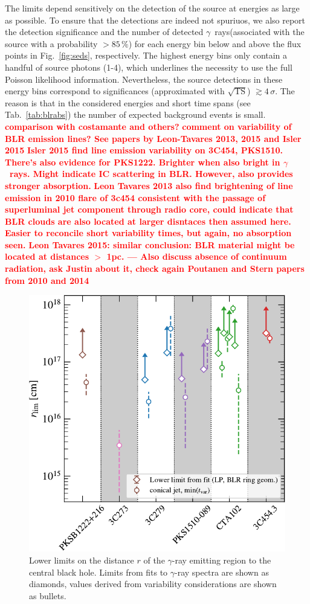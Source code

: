 \documentclass[twocolumn,linenumbers]{aastex62}
\newcommand{\Grays}{$\gamma$~rays\xspace}
\newcommand{\gray}{$\gamma$-ray\xspace}
\newcommand{\todo}[1]{\textbf{\textcolor{red}{#1}}}
\begin{document}
The limits depend sensitively on the detection of the source at energies as large as possible. To ensure that the detections are indeed not spuriuos, we also report the detection significance and the number of detected \Grays (associated with the source with a probability $>85\,\%$) for each energy bin below and above the flux points in Fig.~\ref{fig:seds}, respectively. The highest energy bins only contain a handful of source photons (1-4), which underlines the necessity to use the full Poisson likelihood information. 
Nevertheless, the source detections in these energy bins correspond to significances (approximated with  $\sqrt{\mathrm{TS}}$) $\gtrsim 4\,\sigma$.
The reason is that in the considered energies and short time spans (see Tab.~\ref{tab:blrabs}) the number of expected background events is small. 
\todo{comparison with costamante and others?}
\todo{comment on variability of BLR emission lines? See papers by Leon-Tavares 2013, 2015 and Isler 2015}
\todo{Isler 2015 find line emission variability on 3C454, PKS1510. There's also evidence for PKS1222. Brighter when also bright in \Grays. Might indicate IC scattering in BLR. However, also provides stronger absorption.} 
\todo{Leon Tavares 2013 also find brightening of line emission in 2010 flare of 3c454 consistent with the passage of superluminal jet component through radio core, could indicate that BLR clouds are also located at larger disntaces then assumed here. Easier to reconcile short variability times, but again, no absorption seen.}
\todo{Leon Tavares 2015: similar conclusion: BLR material might be located at distances $>$ 1pc. --- Also discuss absence of continuum radiation, ask Justin about it, check again Poutanen and Stern papers from 2010 and 2014}

\begin{figure}
    \centering
    \includegraphics[width = .9\linewidth]{figures/limits.pdf}
    \caption{Lower limits on the distance $r$ of the \gray emitting region to the central black hole. Limits from fits to \gray spectra are shown as diamonds, values derived from variability considerations are shown as bullets. }
    \label{fig:blr_limits}
\end{figure}
\end{document}

